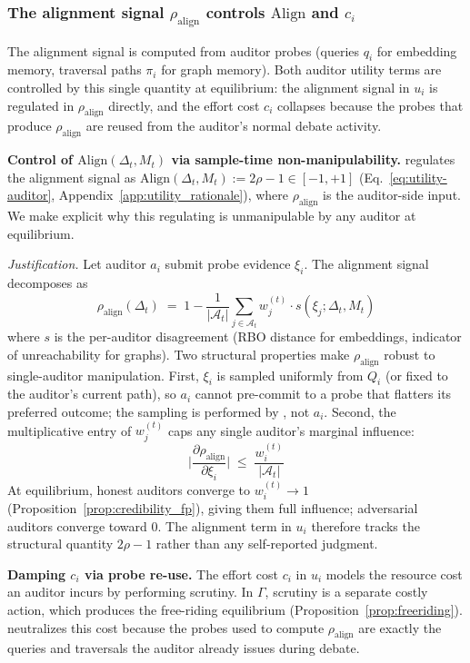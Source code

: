 \subsubsection{The alignment signal \texorpdfstring{$\rho_{\text{align}}$}{rho\_align} controls \texorpdfstring{$\mathrm{Align}$}{Align} and \texorpdfstring{$c_i$}{c\_i}}

The alignment signal is computed from auditor probes (queries $q_i$ for
embedding memory, traversal paths $\pi_i$ for graph memory). Both
auditor utility terms are controlled by this single quantity at
equilibrium: the alignment signal in $u_i$ is regulated in
$\rho_{\text{align}}$ directly, and the effort cost $c_i$ collapses
because the probes that produce $\rho_{\text{align}}$ are reused from
the auditor's normal debate activity.

\textbf{Control of $\mathrm{Align}(\Delta_t,M_t)$ via sample-time non-manipulability.}
\system regulates the alignment signal as
$\mathrm{Align}(\Delta_t,M_t) := 2\rho - 1 \in [-1,+1]$
(Eq.~\ref{eq:utility-auditor}, Appendix~\ref{app:utility_rationale}),
where $\rho_{\text{align}}$ is the auditor-side input. We make
explicit why this regulating is unmanipulable by any auditor at
equilibrium.

\textit{Justification.}
Let auditor $a_i$ submit probe evidence $\xi_i$. The alignment signal
decomposes as
\[
\rho_{\text{align}}(\Delta_t)
\;=\; 1 - \frac{1}{|\mathcal{A}_t|}\sum_{j\in\mathcal{A}_t} w_j^{(t)}\cdot s(\xi_j;\Delta_t,M_t)
\]
where $s$ is the per-auditor disagreement (RBO distance for embeddings,
indicator of unreachability for graphs). Two structural properties
make $\rho_{\text{align}}$ robust to single-auditor manipulation.
First, $\xi_i$ is sampled uniformly from $Q_i$ (or fixed to the
auditor's current path), so $a_i$ cannot pre-commit to a probe that
flatters its preferred outcome; the sampling is performed by \system,
not $a_i$. Second, the multiplicative entry of $w_j^{(t)}$ caps any
single auditor's marginal influence:
\[
\Big|\frac{\partial \rho_{\text{align}}}{\partial \xi_i}\Big| \;\leq\; \frac{w_i^{(t)}}{|\mathcal{A}_t|}
\]
At equilibrium, honest auditors converge to $w_i^{(t)}\to 1$
(Proposition~\ref{prop:credibility_fp}), giving them full influence;
adversarial auditors converge toward $0$. The alignment term in $u_i$
therefore tracks the structural quantity $2\rho-1$ rather than any
self-reported judgment.

\textbf{Damping $c_i$ via probe re-use.}
The effort cost $c_i$ in $u_i$ models the resource cost an auditor
incurs by performing scrutiny. In $\Gamma$, scrutiny is a separate
costly action, which produces the free-riding equilibrium
(Proposition~\ref{prop:freeriding}). \system neutralizes this cost
because the probes used to compute $\rho_{\text{align}}$ are exactly
the queries and traversals the auditor already issues during debate.

